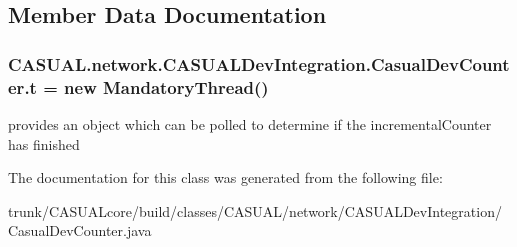 \subsection{Member Data Documentation}
\hypertarget{class_c_a_s_u_a_l_1_1network_1_1_c_a_s_u_a_l_dev_integration_1_1_casual_dev_counter_a5acf7d2eb81f01d672930725d2c4cf2a}{
\subsubsection[{t}]{ C\-A\-S\-U\-A\-L.\-network.\-C\-A\-S\-U\-A\-L\-Dev\-Integration.\-Casual\-Dev\-Counter.\-t = new {\bf Mandatory\-Thread}()}}\label{class_c_a_s_u_a_l_1_1network_1_1_c_a_s_u_a_l_dev_integration_1_1_casual_dev_counter_a5acf7d2eb81f01d672930725d2c4cf2a}
provides an object which can be polled to determine if the incremental\-Counter has finished 

The documentation for this class was generated from the following file\-:\begin{DoxyCompactItemize}
\item 
trunk/\-C\-A\-S\-U\-A\-Lcore/build/classes/\-C\-A\-S\-U\-A\-L/network/\-C\-A\-S\-U\-A\-L\-Dev\-Integration/Casual\-Dev\-Counter.\-java\end{DoxyCompactItemize}
